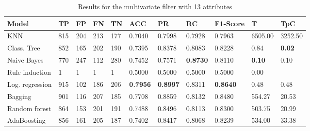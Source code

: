 \documentclass[a4paper,11pt]{article}
\begin{document}
\begin{table}
\centering
\begin{tabular}{|l|l|l|l|l|l|l|l|l|l|l|}
\hline

\textbf{Model} & \textbf{TP} & \textbf{FP} & \textbf{FN} & \textbf{TN} & \textbf{ACC} & \textbf{PR} & \textbf{RC} & \textbf{F1-Score} & \textbf{T} & \textbf{TpC} \\ \hline
KNN & 815 & 204 & 213 & 177 & 0.7040 & 0.7998 & 0.7928 & 0.7963 & 6505.00 & 3252.50 \\ \hline
Class. Tree & 852 & 165 & 202 & 190 & 0.7395 & 0.8378 & 0.8083 & 0.8228 & 0.84 & \textbf{0.02} \\ \hline
Naive Bayes & 770 & 247 & 112 & 280 & 0.7452 & 0.7571 & \textbf{0.8730} & 0.8110 & \textbf{0.10} & 0.10 \\ \hline
Rule induction & 1 & 1 & 1 & 1 & 0.5000 & 0.5000 & 0.5000 & 0.5000 & 0.00 \\ \hline
Log. regression & 915 & 102 & 186 & 206 & \textbf{0.7956} & \textbf{0.8997} & 0.8311 & \textbf{0.8640} & 0.48 & 0.48 \\ \hline
Bagging & 901 & 116 & 207 & 185 & 0.7708 & 0.8859 & 0.8132 & 0.8480 & 554.27 & 20.53 \\ \hline
Random forest & 864 & 153 & 201 & 191 & 0.7488 & 0.8496 & 0.8113 & 0.8300 & 503.75 & 20.99 \\ \hline
AdaBoosting & 856 & 161 & 205 & 187 & 0.7402 & 0.8417 & 0.8068 & 0.8239 & 534.00 & 33.38 \\ \hline

\end{tabular}
\caption{Results for the multivariate filter with 13 attributes}
\label{class:f50m}
\end{table}
\end{document}
